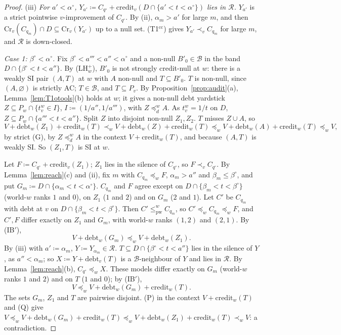 \documentclass[11pt]{article}
\theoremstyle{definition}\newtheorem{definition}[theorem]{Definition}
\theoremstyle{remark}\newtheorem{remark}[theorem]{Remark}
\newcommand{\debt}{\mathrm{debt}}
\newcommand{\cred}{\mathrm{credit}}
\newcommand{\Bfam}{\mathcal B}
\newcommand{\pw}{\mathrm{pw}}
\newcommand{\Tcc}{\textup{(T1$^{\mathrm{cc}}$)}}
\begin{document}
\begin{proof}
(iii) \emph{For $a'<\alpha^\circ$, $Y_{a'}\coloneqq C_{q^\circ}+
\cred_v(D\cap\{a'<t<\alpha^\circ\})$ lies in $\mathcal R$.} $Y_{a'}$ is a
strict pointwise $v$-improvement of $C_{q^\circ}$. By (ii), $\alpha_m>a'$
for large $m$, and then $\mathrm{Cr}_v(C_{q_m})\cap D\subseteq\mathrm{Cr}_v
(Y_{a'})$ up to a null set. \Tcc{} gives $Y_{a'}\prec_vC_{q_m}$ for large
$m$, and $\mathcal R$ is down-closed.

\emph{Case 1: $\beta^\circ<\alpha^\circ$.} Fix
$\beta^\circ<a'''<a''<\alpha^\circ$ and a non-null $B'_0\in\Bfam$ in the band
$D\cap\{\beta^\circ<t<a''\}$. By (LH$^+_w$), $B'_0$ is not strongly
credit-null at $w$: there is a weakly SI pair $(A,T)$ at $w$ with $A$
non-null and $T\subseteq B'_0$. $T$ is non-null, since $(A,\varnothing)$ is
strictly AC; $T\in\Bfam$, and $T\subseteq P_v$. By
Proposition~\ref{prop:audit}(a), Lemma~\ref{lem:T1otools}(b) holds at $w$;
it gives a non-null debt yardstick $Z\subseteq P_w\cap\{t^w_v\in I\}$,
$I\coloneqq(1/a'',1/a''')$, with $Z\preceq^w_dA$. As $t^w_v=1/t$ on $D$,
$Z\subseteq P_w\cap\{a'''<t<a''\}$. Split $Z$ into disjoint non-null $Z_1,
Z_2$. $T$ misses $Z\cup A$, so
\[
 V+\debt_w(Z_1)+\cred_w(T)\prec_wV+\debt_w(Z)+\cred_w(T)\preceq_w
 V+\debt_w(A)+\cred_w(T)\preceq_wV,
\]
by strict (G), by $Z\preceq^w_dA$ in the context $V+\cred_w(T)$, and because
$(A,T)$ is weakly SI. So $(Z_1,T)$ is SI at $w$.

Let $F\coloneqq C_{q^\circ}+\cred_v(Z_1)$; $Z_1$ lies in the silence of
$C_{q^\circ}$, so $F\prec_vC_{q^\circ}$. By Lemma~\ref{lem:reach}(c) and
(ii), fix $m$ with $C_{q_m}\preceq_wF$, $\alpha_m>a''$ and
$\beta_m\le\beta^\circ$, and put $G_m\coloneqq D\cap\{\alpha_m<t<
\alpha^\circ\}$. $C_{q_m}$ and $F$ agree except on $D\cap\{\beta_m<t<
\beta^\circ\}$ (world-$w$ ranks $1$ and $0$), on $Z_1$ ($1$ and $2$) and on
$G_m$ ($2$ and $1$). Let $C'$ be $C_{q_m}$ with debt at $v$ on
$D\cap\{\beta_m<t<\beta^\circ\}$. Then $C'\le^w_\pw C_{q_m}$, so
$C'\preceq_wC_{q_m}\preceq_wF$, and $C',F$ differ exactly on $Z_1$ and
$G_m$, with world-$w$ ranks $(1,2)$ and $(2,1)$. By (IB$'$),
\[
 V+\debt_w(G_m)\preceq_wV+\debt_w(Z_1).\tag{P}
\]
By (iii) with $a'\coloneqq\alpha_m$, $Y\coloneqq Y_{\alpha_m}\in\mathcal R$.
$T\subseteq D\cap\{\beta^\circ<t<a''\}$ lies in the silence of $Y$, as
$a''<\alpha_m$; so $X\coloneqq Y+\debt_v(T)$ is a $\Bfam$-neighbour of $Y$
and lies in $\mathcal R$. By Lemma~\ref{lem:reach}(b),
$C_{q^\circ}\preceq_wX$. These models differ exactly on $G_m$
(world-$w$ ranks $1$ and $2$) and on $T$ ($1$ and $0$); by (IB$'$),
\[
 V\preceq_wV+\debt_w(G_m)+\cred_w(T).\tag{Q}
\]
The sets $G_m$, $Z_1$ and $T$ are pairwise disjoint. (P) in the context
$V+\cred_w(T)$ and (Q) give $V\preceq_wV+\debt_w(G_m)+\cred_w(T)
\preceq_wV+\debt_w(Z_1)+\cred_w(T)\prec_wV$: a contradiction.


\end{proof}
\end{document}

